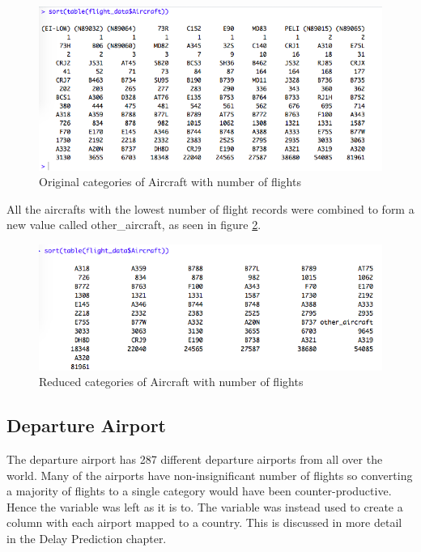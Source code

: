 \begin{figure}[H]
    \centering
    \includegraphics[width=\textwidth]{Figures/Aircraft_orig_levels.png}
    \caption{Original categories of Aircraft with number of flights}
    \label{fig:aircraft1}
\end{figure}

All the aircrafts with the lowest number of flight records were combined to form a new value called other\_aircraft, as seen in figure \ref{fig:aircraft2}.

\begin{figure}[H]
    \centering
    \includegraphics[width=\textwidth]{Figures/Aircraft_reduced_levels.png}
    \caption{Reduced categories of Aircraft with number of flights}
    \label{fig:aircraft2}
\end{figure}

\subsection{Departure Airport}
The departure airport has 287 different departure airports from all over the world. Many of the airports have non-insignificant number of flights so converting a majority of flights to a single category would have been counter-productive. Hence the variable was left as it is 
to. The variable was instead used to create a column with each airport mapped to a country. This is discussed in more detail in the Delay Prediction chapter.

